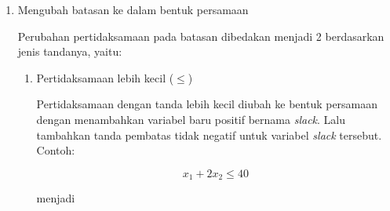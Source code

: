\begin{enumerate}
	

		
		
		
	
		
		
		

	\item Mengubah batasan ke dalam bentuk persamaan
	
		Perubahan pertidaksamaan pada batasan dibedakan menjadi 2 berdasarkan jenis tandanya, yaitu:
		
		\begin{enumerate}
			\item Pertidaksamaan lebih kecil (\(\leq\))		

				Pertidaksamaan dengan tanda lebih kecil diubah ke bentuk persamaan dengan menambahkan variabel baru positif bernama \textit{slack}. Lalu tambahkan tanda pembatas tidak negatif untuk variabel \textit{slack} tersebut. Contoh:
				
				\begin{equation*}
					x_1 + 2x_2 \leq 40
				\end{equation*}
				
				menjadi
				

\end{enumerate}
\end{enumerate}
